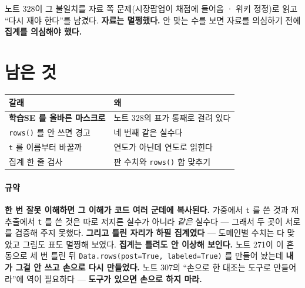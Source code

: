 \documentclass[10pt]{article}
\begin{document}
노트 328이 그 불일치를 자료 쪽 문제(시장팝업이 채점에 들어옴 · 위키 정정)로
읽고 ``다시 재야 한다''를 남겼다. \textbf{자료는 멀쩡했다.} 안 맞는 수를
보면 자료를 의심하기 전에 \textbf{집계를 의심해야 했다.}

\section{남은 것}
\begin{center}\footnotesize
\begin{tabular}{ll}
\hline
갈래 & 왜 \\
\hline
\textbf{학습SE 를 올바른 마스크로} & 노트 328의 표가 통째로 걸려 있다 \\
\texttt{rows()} 를 안 쓰면 경고 & 네 번째 같은 실수다 \\
\texttt{t} 를 이름부터 바꿀까 & 연도가 아닌데 연도로 읽힌다 \\
집계 한 줄 검사 & 판 수치와 \texttt{rows()} 합 맞추기 \\
\hline
\end{tabular}
\end{center}

\paragraph{규약} \textbf{한 번 잘못 이해하면 그 이해가 코드 여러 군데에
복사된다.} 가중에서 \texttt{t} 를 쓴 것과 재추출에서 \texttt{t} 를 쓴 것은
따로 저지른 실수가 아니라 \emph{같은} 실수다 --- 그래서 두 곳이 서로를
검증해 주지 못했다. \textbf{그리고 틀린 자리가 하필 집계였다} --- 도메인별
수치는 다 맞았고 그림도 표도 멀쩡해 보였다. \textbf{집계는 틀려도 안 이상해
보인다.} 노트 271이 이 혼동으로 세 번 틀린 뒤 \texttt{Data.rows(post=True,
labeled=True)} 를 만들어 놨는데 \textbf{내가 그걸 안 쓰고 손으로 다시
만들었다.} 노트 307의 ``손으로 한 대조는 도구로 만들어라''에 역이 필요하다
--- \textbf{도구가 있으면 손으로 하지 마라.}
\end{document}
